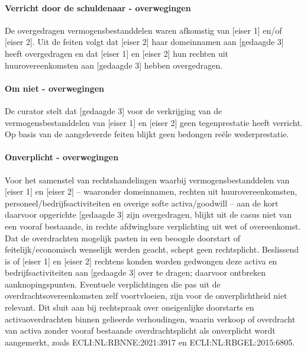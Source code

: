 \documentclass[
  dutch,
  a4paper,
]{article}
\begin{document}
\paragraph{Verricht door de schuldenaar - overwegingen}\label{verricht-door-de-schuldenaar---overwegingen-25}

De overgedragen vermogensbestanddelen waren afkomstig van {[}eiser 1{]} en/of {[}eiser 2{]}. Uit de feiten volgt dat {[}eiser 2{]} haar domeinnamen aan {[}gedaagde 3{]} heeft overgedragen en dat {[}eiser 1{]} en {[}eiser 2{]} hun rechten uit huurovereenkomsten aan {[}gedaagde 3{]} hebben overgedragen.

\paragraph{Om niet - overwegingen}\label{om-niet---overwegingen-25}

De curator stelt dat {[}gedaagde 3{]} voor de verkrijging van de vermogensbestanddelen van {[}eiser 1{]} en {[}eiser 2{]} geen tegenprestatie heeft verricht. Op basis van de aangeleverde feiten blijkt geen bedongen reële wederprestatie.

\paragraph{Onverplicht - overwegingen}\label{onverplicht---overwegingen-25}

Voor het samenstel van rechtshandelingen waarbij vermogensbestanddelen van {[}eiser 1{]} en {[}eiser 2{]} -- waaronder domeinnamen, rechten uit huurovereenkomsten, personeel/bedrijfsactiviteiten en overige softe activa/goodwill -- aan de kort daarvoor opgerichte {[}gedaagde 3{]} zijn overgedragen, blijkt uit de casus niet van een vooraf bestaande, in rechte afdwingbare verplichting uit wet of overeenkomst. Dat de overdrachten mogelijk pasten in een beoogde doorstart of feitelijk/economisch wenselijk werden geacht, schept geen rechtsplicht. Beslissend is of {[}eiser 1{]} en {[}eiser 2{]} rechtens konden worden gedwongen deze activa en bedrijfsactiviteiten aan {[}gedaagde 3{]} over te dragen; daarvoor ontbreken aanknopingspunten. Eventuele verplichtingen die pas uit de overdrachtsovereenkomsten zelf voortvloeien, zijn voor de onverplichtheid niet relevant. Dit sluit aan bij rechtspraak over oneigenlijke doorstarts en activaoverdrachten binnen gelieerde verhoudingen, waarin verkoop of overdracht van activa zonder vooraf bestaande overdrachtsplicht als onverplicht wordt aangemerkt, zoals ECLI:NL:RBNNE:2021:3917 en ECLI:NL:RBGEL:2015:6805.
\end{document}
